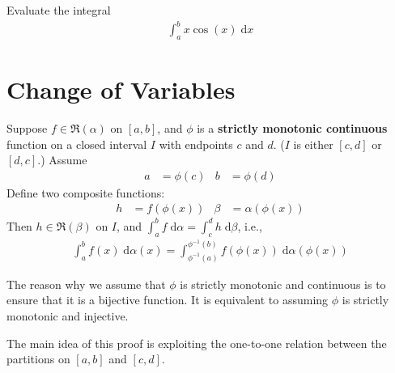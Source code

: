 \documentclass[thmcnt=section, 12pt]{my-elegantbook}
\begin{document}

\begin{exercise}
    Evaluate the integral 
    \begin{align*}
        \int_{a}^{b} x \cos(x) \; \mathrm{d}x
    \end{align*}
\end{exercise}


\section{Change of Variables}


\begin{theorem} \label{thm:21}
    Suppose $f \in \mathfrak{R}(\alpha)$ on $[a, b]$, and $\phi$ is a \textbf{strictly monotonic continuous} function on a closed interval $I$ with endpoints $c$ and $d$. ($I$ is either $[c, d]$ or $[d, c]$.) Assume
    \begin{align*}
        a &= \phi(c) & b &= \phi(d)
    \end{align*}
    Define two composite functions:
    \begin{align*}
        h &= f(\phi(x)) & 
        \beta &= \alpha(\phi(x))
    \end{align*}
    Then $h \in \mathfrak{R}(\beta)$ on $I$, and $\int_a^b f \; \mathrm{d}\alpha = \int_c^d h \; \mathrm{d}\beta$, i.e., 
    \begin{align*}
        \int_a^b f(x) \; \mathrm{d}\alpha(x) = \int_{\phi^{-1}(a)}^{\phi^{-1}(b)} f(\phi(x)) \; \mathrm{d}\alpha(\phi(x))
    \end{align*}
\end{theorem}

\begin{remark}
    The reason why we assume that $\phi$ is strictly monotonic and continuous is to ensure that it is a bijective function. It is equivalent to assuming $\phi$ is strictly monotonic and injective.
\end{remark}

\par The main idea of this proof is exploiting the one-to-one relation between the partitions on $[a, b]$ and $[c, d]$. 
\end{document}
